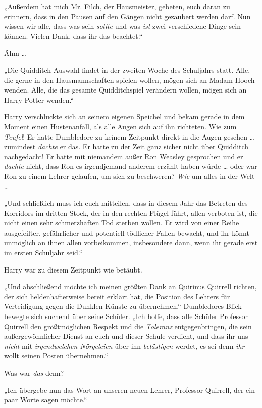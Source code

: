 {„Außerdem hat mich Mr. Filch, der Hausmeister, gebeten, euch daran zu erinnern, dass in den Pausen auf den Gängen nicht gezaubert werden darf. Nun wissen wir alle, dass was sein \emph{sollte} und was \emph{ist} zwei verschiedene Dinge sein können. Vielen Dank, dass ihr das beachtet.“

Ähm …

„Die Quidditch-Auswahl findet in der zweiten Woche des Schuljahrs statt. Alle, die gerne in den Hausmannschaften spielen wollen, mögen sich an Madam Hooch wenden. Alle, die das gesamte Quidditchspiel verändern wollen, mögen sich an Harry Potter wenden.“

Harry verschluckte sich an seinem eigenen Speichel und bekam gerade in dem Moment einen Hustenanfall, als alle Augen sich auf ihn richteten. Wie zum \emph{Teufel}! Er hatte Dumbledore zu keinem Zeitpunkt direkt in die Augen gesehen … zumindest \emph{dachte} er das. Er hatte zu der Zeit ganz sicher nicht über Quidditch nachgedacht! Er hatte mit niemandem außer Ron Weasley gesprochen und er \emph{dachte} nicht, dass Ron es irgendjemand anderem erzählt haben würde … oder war Ron zu einem Lehrer gelaufen, um sich zu beschweren? \emph{Wie} um alles in der Welt …

„Und schließlich muss ich euch mitteilen, dass in diesem Jahr das Betreten des Korridors im dritten Stock, der in den rechten Flügel führt, allen verboten ist, die nicht einen sehr schmerzhaften Tod sterben wollen. Er wird von einer Reihe ausgefeilter, gefährlicher und potentiell tödlicher Fallen bewacht, und ihr könnt unmöglich an ihnen allen vorbeikommen, insbesondere dann, wenn ihr gerade erst im ersten Schuljahr seid.“

Harry war zu diesem Zeitpunkt wie betäubt.

„Und abschließend möchte ich meinen größten Dank an Quirinus Quirrell richten, der sich heldenhafterweise bereit erklärt hat, die Position des Lehrers für Verteidigung gegen die Dunklen Künste zu übernehmen.“ Dumbledores Blick bewegte sich suchend über seine Schüler. „Ich hoffe, dass alle Schüler Professor Quirrell den größtmöglichen Respekt und die \emph{Toleranz} entgegenbringen, die sein außergewöhnlicher Dienst an euch und dieser Schule verdient, und dass ihr uns \emph{nicht} mit \emph{irgendwelchen Nörgeleien} über ihn \emph{belästigen} werdet, es sei denn \emph{ihr} wollt seinen Posten übernehmen.“

Was war \emph{das} denn?

„Ich übergebe nun das Wort an unseren neuen Lehrer, Professor Quirrell, der ein paar Worte sagen möchte.“

}
